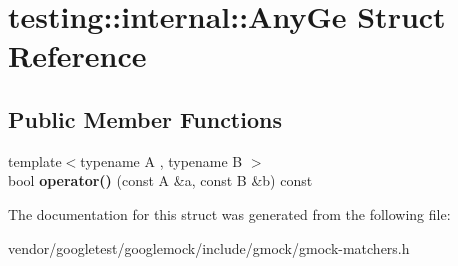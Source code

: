 \hypertarget{structtesting_1_1internal_1_1_any_ge}{}\section{testing\+:\+:internal\+:\+:Any\+Ge Struct Reference}
\label{structtesting_1_1internal_1_1_any_ge}
\subsection*{Public Member Functions}
\begin{DoxyCompactItemize}
\item 
\mbox{\label{structtesting_1_1internal_1_1_any_ge_ac4bace6395f9517bc93f34bc1479227d}} 
{\footnotesize template$<$typename A , typename B $>$ }\\bool {\bfseries operator()} (const A \&a, const B \&b) const
\end{DoxyCompactItemize}


The documentation for this struct was generated from the following file\+:\begin{DoxyCompactItemize}
\item 
vendor/googletest/googlemock/include/gmock/gmock-\/matchers.\+h\end{DoxyCompactItemize}
